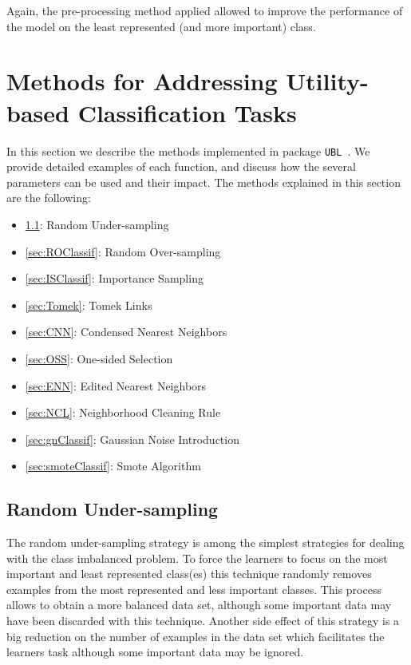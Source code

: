 \documentclass[10pt,a4paper]{article}\usepackage[]{graphicx}\usepackage[]{color}
\newcommand{\pUBL}{package \texttt{UBL}\ }
\begin{document}
Again, the pre-processing method applied allowed to improve the performance of the model on the least represented (and more important) class.


\section{Methods for Addressing Utility-based Classification Tasks }\label{sec:methClass}

In this section we describe the methods implemented in \pUBL. We provide detailed examples of each function, and discuss how the several parameters can be used and their impact.
The methods explained in this section are the following:
\begin{itemize}
\item \ref{sec:RUClassif}: Random Under-sampling
\item \ref{sec:ROClassif}: Random Over-sampling
\item \ref{sec:ISClassif}: Importance Sampling
\item \ref{sec:Tomek}: Tomek Links
\item \ref{sec:CNN}: Condensed Nearest Neighbors
\item \ref{sec:OSS}: One-sided Selection
\item \ref{sec:ENN}: Edited Nearest Neighbors
\item \ref{sec:NCL}: Neighborhood Cleaning Rule
\item \ref{sec:gnClassif}: Gaussian Noise Introduction
\item \ref{sec:smoteClassif}: Smote Algorithm
\end{itemize}

\subsection{Random Under-sampling}\label{sec:RUClassif}

The random under-sampling strategy is among the simplest strategies for dealing with the class imbalanced problem. To force the learners to focus on the most important and least represented class(es) this technique randomly removes examples from the most represented and less important classes. This process allows to obtain a more balanced data set, although some important data may have been discarded with this technique. Another side effect of this strategy is a big reduction on the number of examples in the data set which facilitates the learners task although some important data may be ignored.
\end{document}
